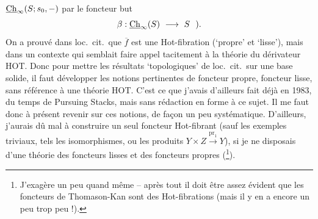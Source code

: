 
$\underline{\mathrm{Ch}}_{\infty}(S; s_0, -)$ par le foncteur but
\[
\beta : \Ch_{\infty}(S) \ \longrightarrow\ S \ \ ).
\]
On a prouvé dans loc.\ cit.\ que $\overline{f}$ est une Hot-fibration (‘propre’ et ‘lisse’), mais dans un contexte qui semblait faire appel tacitement à la théorie du dérivateur HOT. Donc pour mettre les résultats ‘topologiques’ de loc.\ cit.\ sur une base solide, il faut développer les notions pertinentes de foncteur propre, foncteur lisse, sans référence à une théorie HOT. C'est ce que j'avais d'ailleurs fait déjà en 1983, du temps de Pursuing Stacks, mais sans rédaction en forme à ce sujet. Il me faut donc à présent revenir sur ces notions, de façon un peu systématique. D'ailleurs, j'aurais dû mal à construire un seul foncteur Hot-fibrant (sauf les exemples triviaux, tels les isomorphismes, ou les produits $Y \times Z \xrightarrow{\mathrm{pr}_1} Y$), si je ne disposais d'une théorie des foncteurs lisses et des foncteurs propres (\footnote{J'exagère un peu quand même -- après tout il doit être assez évident que les foncteurs de Thomason-Kan sont des Hot-fibrations (mais il y en a encore un peu trop peu !).}). %

